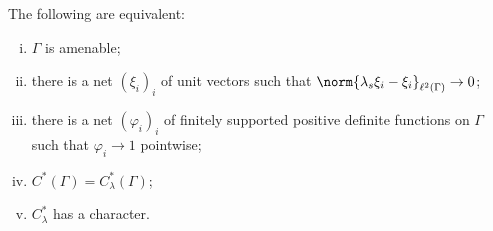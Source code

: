 \documentclass[10pt]{mypackage}
\begin{document}
\begin{theorem}
  The following are equivalent:
  \begin{enumerate}[(i)]
    \item $\Gamma$ is amenable;
    \item there is a net $\left( \xi_i \right)_i$ of unit vectors such that $\norm{\lambda_s\xi_i - \xi_i}_{\ell^2(\Gamma)}\to 0$;
    \item there is a net $\left( \varphi_i \right)_i$ of finitely supported positive definite functions on $\Gamma$ such that $\varphi_i\to 1$ pointwise;
    \item $C^{\ast}\left( \Gamma \right) = C^{\ast}_{\lambda}\left( \Gamma \right)$;
    \item $C^{\ast}_{\lambda}$ has a character.
  \end{enumerate}
\end{theorem}
\end{document}
